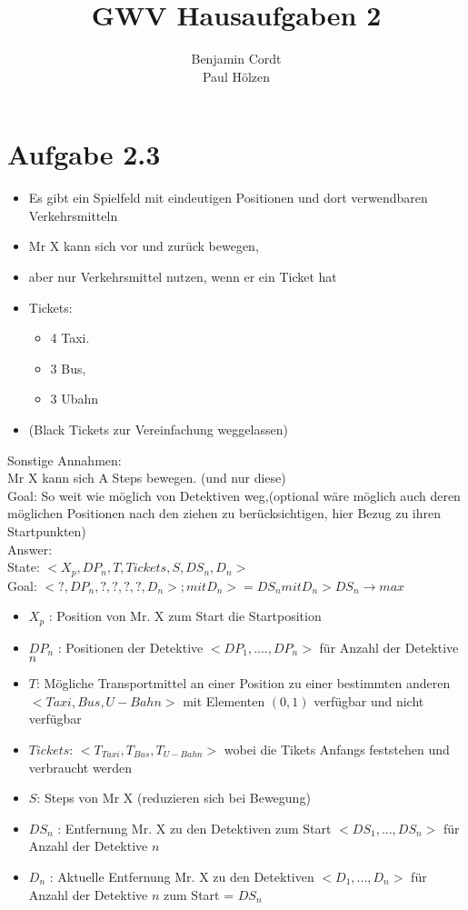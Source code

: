 \documentclass[12pt, paper=a4]{article}
\author{Benjamin Cordt\\Paul Hölzen}
\title{GWV Hausaufgaben 2}
\begin{document}
\maketitle

\section*{Aufgabe 2.3}

\begin{itemize}
\item Es gibt ein Spielfeld mit eindeutigen Positionen und dort
verwendbaren Verkehrsmitteln
\item Mr X kann sich vor und zurück bewegen,
\item aber nur Verkehrsmittel nutzen, wenn er ein Ticket hat
\item Tickets:
    \begin{itemize}
    \item 4 Taxi.
    \item 3 Bus,
    \item 3 Ubahn
    \end{itemize}
\item (Black Tickets zur Vereinfachung weggelassen)
\end{itemize}

Sonstige Annahmen:\\
Mr X kann sich A Steps bewegen. (und nur diese)\\
Goal: So weit wie möglich von Detektiven weg,(optional wäre möglich
auch deren möglichen Positionen nach den ziehen zu berücksichtigen,
hier Bezug zu ihren Startpunkten)\\
Answer:\\
State: $< X_p , DP_n , T, Tickets, S, DS_n , D_n >$\\
Goal: $<?, DP_n ,?,?,?,?,D_n > ; mit D_n >= DS_n mit D_n > DS_n \rightarrow max$\\

\begin{itemize}
\item $X_p$ : Position von Mr. X zum Start die Startposition
\item $DP_n$ : Positionen der Detektive $<DP_1 , .... , DP_n >$ für Anzahl der Detektive $n$
\item $T$: Mögliche Transportmittel an einer Position zu einer bestimmten anderen $< Taxi, Bus, U-Bahn>$ mit Elementen $(0,1)$ verfügbar und nicht verfügbar
\item $Tickets$: $<T_{Taxi} , T_{Bus} , T_{U-Bahn} >$ wobei die Tikets Anfangs feststehen und verbraucht werden
\item $S$: Steps von Mr X (reduzieren sich bei Bewegung)
\item $DS_n$ : Entfernung Mr. X zu den Detektiven zum Start $< DS_1 , ..., DS_n >$ für Anzahl der Detektive $n$
\item $D_n$ : Aktuelle Entfernung Mr. X zu den Detektiven $< D_1 , ..., D_n >$ für Anzahl der Detektive $n$ zum Start = $DS_n$
\end{itemize}
\end{document}
